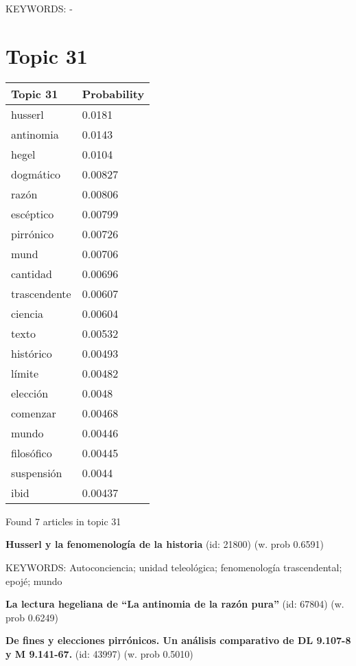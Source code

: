 \documentclass{article}
\begin{document}
KEYWORDS:
-

\vfill
\newpage


\centering
\thispagestyle{empty}
\section*{Topic 31}\vfill
\begin{tabular}{ll}
\toprule
     Topic 31 & Probability \\
\midrule
      husserl &      0.0181 \\
    antinomia &      0.0143 \\
        hegel &      0.0104 \\
    dogmático &     0.00827 \\
        razón &     0.00806 \\
    escéptico &     0.00799 \\
    pirrónico &     0.00726 \\
         mund &     0.00706 \\
     cantidad &     0.00696 \\
 trascendente &     0.00607 \\
      ciencia &     0.00604 \\
        texto &     0.00532 \\
    histórico &     0.00493 \\
       límite &     0.00482 \\
     elección &      0.0048 \\
     comenzar &     0.00468 \\
        mundo &     0.00446 \\
   filosófico &     0.00445 \\
   suspensión &      0.0044 \\
         ibid &     0.00437 \\
\bottomrule
\end{tabular}

\vfill
Found 7 articles in topic 31
\vfill

\textbf{Husserl y la fenomenología de la historia} (id: 21800)
 (w. prob 0.6591)


KEYWORDS:
Autoconciencia; unidad teleológica; fenomenología trascendental; epojé; mundo
\vfill

\textbf{La lectura hegeliana de “La antinomia de la razón pura”} (id: 67804)
 (w. prob 0.6249)
\vfill

\textbf{De fines y elecciones pirrónicos. Un análisis comparativo de DL 9.107-8 y M 9.141-67.} (id: 43997)
 (w. prob 0.5010)
\end{document}
